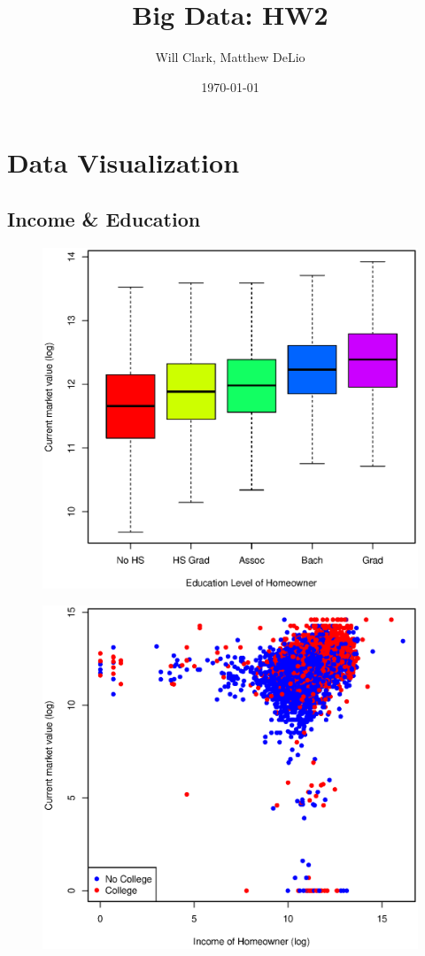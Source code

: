 \documentclass[11pt, fleqn]{article}
\begin{document}
\title{Big Data: HW2}
\author{Will Clark, Matthew DeLio}
\date{\today}
\maketitle

\section{Data Visualization}
\subsection{Income \& Education}
\begin{figure}[!htb]
  \centering
  \includegraphics[scale=.5]{hhgrad.eps}
  \caption{}
  \label{fig:hhgrad}
\end{figure}

\begin{figure}[!htb]
  \centering
  \includegraphics[scale=.5]{income.eps}
  \caption{}
  \label{fig:income}
\end{figure}
\end{document}
